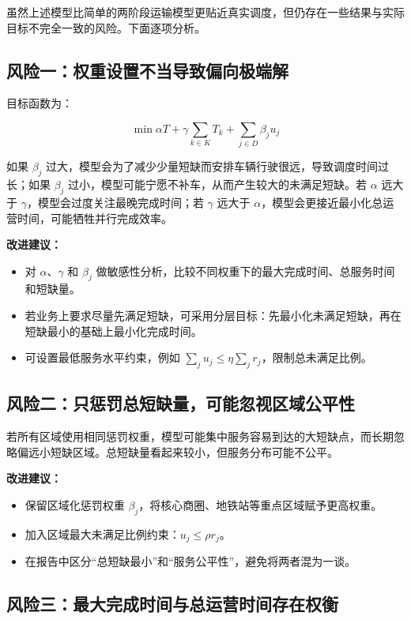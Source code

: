 \documentclass[UTF8,a4paper,12pt]{ctexart}
\begin{document}
虽然上述模型比简单的两阶段运输模型更贴近真实调度，但仍存在一些结果与实际目标不完全一致的风险。下面逐项分析。

\subsection{风险一：权重设置不当导致偏向极端解}

目标函数为：

\[
\min \alpha T+\gamma\sum_{k\in K}T_k+\sum_{j\in D}\beta_j u_j
\]

如果 \(\beta_j\) 过大，模型会为了减少少量短缺而安排车辆行驶很远，导致调度时间过长；如果 \(\beta_j\) 过小，模型可能宁愿不补车，从而产生较大的未满足短缺。若 \(\alpha\) 远大于 \(\gamma\)，模型会过度关注最晚完成时间；若 \(\gamma\) 远大于 \(\alpha\)，模型会更接近最小化总运营时间，可能牺牲并行完成效率。

\textbf{改进建议：}

\begin{itemize}
  \item 对 \(\alpha\)、\(\gamma\) 和 \(\beta_j\) 做敏感性分析，比较不同权重下的最大完成时间、总服务时间和短缺量。
  \item 若业务上要求尽量先满足短缺，可采用分层目标：先最小化未满足短缺，再在短缺最小的基础上最小化完成时间。
  \item 可设置最低服务水平约束，例如 \(\sum_j u_j \le \eta \sum_j r_j\)，限制总未满足比例。
\end{itemize}

\subsection{风险二：只惩罚总短缺量，可能忽视区域公平性}

若所有区域使用相同惩罚权重，模型可能集中服务容易到达的大短缺点，而长期忽略偏远小短缺区域。总短缺量看起来较小，但服务分布可能不公平。

\textbf{改进建议：}

\begin{itemize}
  \item 保留区域化惩罚权重 \(\beta_j\)，将核心商圈、地铁站等重点区域赋予更高权重。
  \item 加入区域最大未满足比例约束：\(u_j\le \rho r_j\)。
  \item 在报告中区分“总短缺最小”和“服务公平性”，避免将两者混为一谈。
\end{itemize}

\subsection{风险三：最大完成时间与总运营时间存在权衡}
\end{document}

